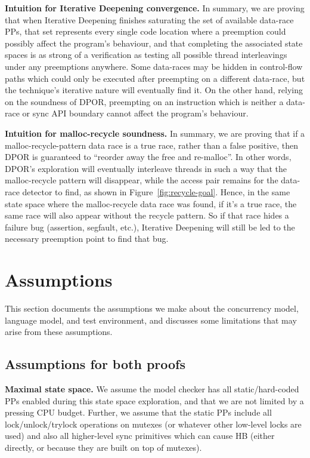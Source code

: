 \documentclass[pldi]{sigplanconf-pldi15}
\begin{document}
{\bf Intuition for Iterative Deepening convergence.}
In summary, we are proving that when Iterative Deepening finishes saturating the set of available data-race PPs,
that set represents every single code location where a preemption could possibly affect the program's behaviour,
and that completing the associated state spaces is as strong of a verification as testing all possible thread interleavings under any preemptions anywhere.
Some data-races may be hidden in control-flow paths which could only be executed after preempting on a different data-race,
but the technique's iterative nature will eventually find it.
On the other hand, relying on the soundness of DPOR, preempting on an instruction which is neither a data-race or sync API boundary cannot affect the program's behaviour.

{\bf Intuition for malloc-recycle soundness.}
In summary, we are proving that if a malloc-recycle-pattern data race is a true race, rather than a false positive,
then DPOR is guaranteed to ``reorder away the free and re-malloc''.
In other words, DPOR's exploration will eventually interleave threads in such a way that the malloc-recycle pattern will disappear,
while the access pair remains for the data-race detector to find, as shown in Figure~\ref{fig:recycle-goal}.
Hence, in the same state space where the malloc-recycle data race was found, if it's a true race, the same race will also appear without the recycle pattern.
So if that race hides a failure bug (assertion, segfault, etc.), Iterative Deepening will still be led to the necessary preemption point to find that bug.


\section{Assumptions}

This section documents the assumptions we make about the concurrency model, language model, and test environment,
and discusses some limitations that may arise from these assumptions.

\subsection{Assumptions for both proofs}

{\bf Maximal state space.}
We assume the model checker has all static/hard-coded PPs enabled during this state space exploration,
and that we are not limited by a pressing CPU budget.
Further, we assume that the static PPs include all lock/unlock/trylock operations on mutexes (or whatever other low-level locks are used) and also all higher-level sync primitives which can cause HB (either directly, or because they are built on top of mutexes).
\end{document}
